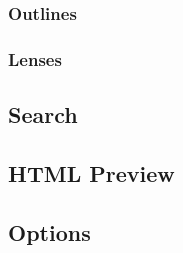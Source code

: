 \documentclass{article}
\begin{document}
\subsubsection{Outlines}\label{gelement:outlines}

\subsubsection{Lenses}\label{gelement:lenses}

\newpage

\subsection{Search}\label{sec:search}

\newpage

\subsection{HTML Preview}\label{sec:html_preview}

\newpage

\subsection{Options}\label{sec:options}
\end{document}
